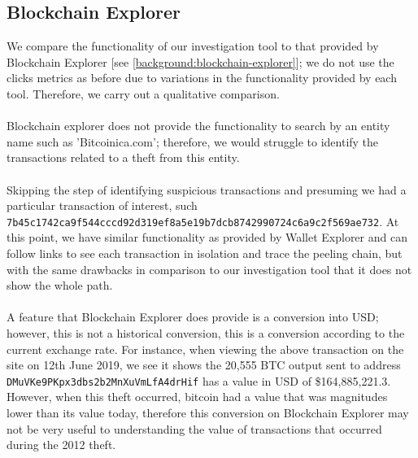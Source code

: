 \subsection{Blockchain Explorer}
We compare the functionality of our investigation tool to that provided by Blockchain Explorer [see \ref{background:blockchain-explorer}]; we do not use the clicks metrics as before due to variations in the functionality provided by each tool. Therefore, we carry out a qualitative comparison.
\\\\
Blockchain explorer does not provide the functionality to search by an entity name such as 'Bitcoinica.com'; therefore, we would struggle to identify the transactions related to a theft from this entity. 
\\\\
Skipping the step of identifying suspicious transactions and presuming we had a particular transaction of interest, such \texttt{7b45c1742ca9f544cccd92d319ef8a5e19b7dcb8742990724c6a9c2f569ae732}. At this point, we have similar functionality as provided by Wallet Explorer and can follow links to see each transaction in isolation and trace the peeling chain, but with the same drawbacks in comparison to our investigation tool that it does not show the whole path. 
\\\\
A feature that Blockchain Explorer does provide is a conversion into USD; however, this is not a historical conversion, this is a conversion according to the current exchange rate. For instance, when viewing the above transaction on the site on 12th June 2019, we see it shows the 20,555 BTC output sent to address \texttt{DMuVKe9PKpx3dbs2b2MnXuVmLfA4drHif} has a value in USD of \$164,885,221.3. However, when this theft occurred, bitcoin had a value that was magnitudes lower than its value today, therefore this conversion on Blockchain Explorer may not be very useful to understanding the value of transactions that occurred during the 2012 theft. 

